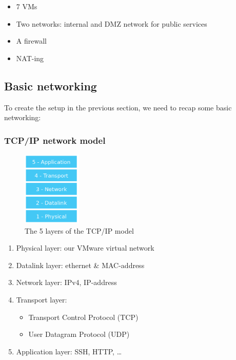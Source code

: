 \documentclass{article}
\begin{document}
\begin{itemize}
    \item 7 VMs
    \item Two networks: internal and DMZ network for public services
    \item A firewall
    \item NAT-ing
\end{itemize}

\subsection{Basic networking}

To create the setup in the previous section, we need to recap some basic networking:

\subsubsection{TCP/IP network model}

\begin{figure}[H]
    \centering
    \includegraphics[width=0.25\textwidth]{tcp-ip.png}
    \caption{The 5 layers of the TCP/IP model}
\end{figure}

\begin{enumerate}
    \item Physical layer: our VMware virtual network
    \item Datalink layer: ethernet \& MAC-address
    \item Network layer: IPv4, IP-address
    \item Transport layer:
    \begin{itemize}
        \item Transport Control Protocol (TCP)
        \item User Datagram Protocol (UDP)
    \end{itemize}
    \item Application layer: SSH, HTTP, \dots
\end{enumerate}
\end{document}
